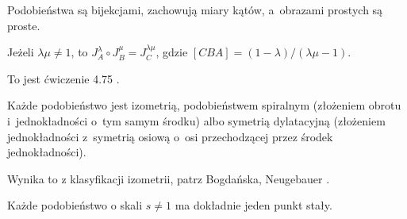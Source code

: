 Podobieństwa są bijekcjami, zachowują miary kątów, a~obrazami prostych są proste.

\begin{proposition}
    Jeżeli $\lambda \mu \neq 1$, to $J_A^\lambda \circ J_B^\mu = J_C^{\lambda \mu}$, gdzie $[CBA] = (1-\lambda) / (\lambda \mu - 1)$.
\end{proposition}

To jest ćwiczenie 4.75 \cite[s. 217]{neugebauer_2018}.

\begin{proposition}
    Każde podobieństwo jest izometrią, podobieństwem spiralnym (złożeniem obrotu i~jednokładności o~tym samym środku) albo symetrią dylatacyjną (złożeniem jednokładności z~symetrią osiową o~osi przechodzącej przez środek jednokładności).
\end{proposition}

Wynika to z klasyfikacji izometrii, patrz Bogdańska, Neugebauer \cite[s. 220]{neugebauer_2018}.

\begin{proposition}
    Każde podobieństwo o skali $s \neq 1$ ma dokładnie jeden punkt stały.
\end{proposition}

%
